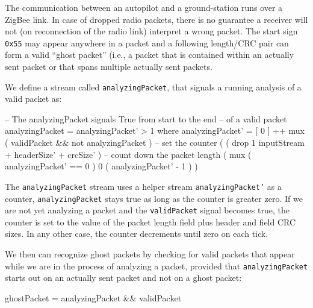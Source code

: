 The communication between an autopilot and a ground-station runs over
a ZigBee link. In case of dropped radio packets, there is no guarantee
a receiver will not (on reconnection of the radio link) interpret a
wrong packet. The start sign {\tt 0x55} may appear anywhere in a
packet and a following length/CRC pair can form a valid ``ghost
packet'' (i.e., a packet that is contained within an actually sent
packet or that spans multiple actually sent packets.

We define a stream called {\tt analyzingPacket}, that signals a running
analysis of a valid packet as:

\begin{code}
-- The analyzingPacket signals True from start to the end
-- of a valid packet
analyzingPacket = analyzingPacket' > 1
  where analyzingPacket' = [ 0 ] ++ mux
               ( validPacket && not analyzingPacket )
                -- set the counter
               ( ( drop 1 inputStream
                   + headerSize'
                   + crcSize' )
                 -- count down the packet length
                 ( mux ( analyzingPacket' == 0 )
                     0
                     ( analyzingPacket' - 1 ) )
\end{code}

The {\tt analyzingPacket} stream uses a helper stream {\tt analyzingPacket'}
as a counter, {\tt analyzingPacket} stays true as long as the counter is greater
zero. If we are not yet analyzing a packet and the {\tt validPacket}
signal becomes true, the counter is set to the value of the packet length
field plus header and field CRC sizes. In any other case, the counter
decrements until zero on each tick.

We then can recognize ghost packets by checking for valid packets that
appear while we are in the process  of analyzing a packet, provided
that {\tt analyzingPacket} starts out on an actually sent packet and
not on a ghost packet:

\begin{code}
ghostPacket = analyzingPacket && validPacket
\end{code}


